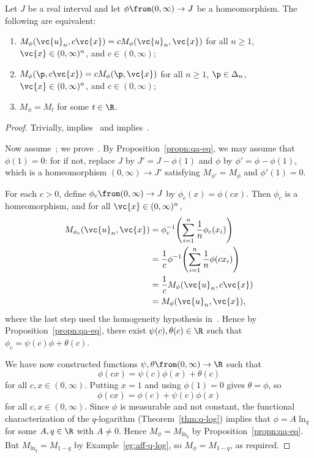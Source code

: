 \begin{thm}
% 
Let $J$ be a real interval and let $\phi \from (0, \infty) \to J$ be a
homeomorphism.  The following are equivalent:
% 
\begin{enumerate}
\item 
{}
$M_\phi(\vc{u}_n, c\vc{x}) = cM_\phi(\vc{u}_n, \vc{x})$ for all $n \geq 1$,
$\vc{x} \in (0, \infty)^n$, and $c \in (0, \infty)$;

\item
{}
$M_\phi(\p, c\vc{x}) = cM_\phi(\p, \vc{x})$ for all $n \geq 1$, $\p \in
\Delta_n$, $\vc{x} \in (0, \infty)^n$, and $c \in (0, \infty)$;

\item
{}
$M_\phi = M_t$ for some $t \in \R$.
\end{enumerate}
\end{thm}

\begin{proof}
Trivially,  implies~ and
 implies~.

Now assume~; we prove~.
By Proposition~\ref{propn:qa-eq}, we may assume that $\phi(1) = 0$: for if
not, replace $J$ by $J' = J - \phi(1)$ and $\phi$ by $\phi' = \phi -
\phi(1)$, which is a homeomorphism $(0, \infty) \to J'$ satisfying
$M_{\phi'} = M_\phi$ and $\phi'(1) = 0$.

For each $c > 0$, define $\phi_c \from (0, \infty) \to J$ by $\phi_c(x) =
\phi(cx)$.  Then $\phi_c$ is a homeomorphism, and for all $\vc{x} \in (0,
\infty)^n$,
% 
\begin{align*}
M_{\phi_c}(\vc{u}_n, \vc{x})    &
=
\phi_c^{-1} \Biggl( 
\sum_{i = 1}^n \frac{1}{n} \phi_c(x_i) 
\Biggr) \\
&
=
\frac{1}{c} \phi^{-1} \Biggl( 
\sum_{i = 1}^n \frac{1}{n} \phi(cx_i)
\Biggr) \\
&
=
\frac{1}{c} M_\phi(\vc{u}_n, c\vc{x})   \\
&
=
M_\phi(\vc{u}_n, \vc{x}),
\end{align*}
% 
where the last step used the homogeneity hypothesis
in~.  Hence by Proposition~\ref{propn:qa-eq},
there exist $\psi(c), \theta(c) \in \R$ such that $\phi_c = \psi(c)\phi +
\theta(c)$.

We have now constructed functions $\psi, \theta \from (0, \infty) \to \R$
such that 
\[
\phi(cx) = \psi(c) \phi(x) + \theta(c)
\]
for all $c, x \in (0, \infty)$.  Putting $x = 1$ and using $\phi(1) = 0$
gives $\theta = \phi$, so
\[
\phi(cx) = \phi(c) + \psi(c) \phi(x)
\]
for all $c, x \in (0, \infty)$.  Since $\phi$ is measurable and not
constant, the functional characterization of the $q$-logarithm
(Theorem~\ref{thm:q-log}) implies that $\phi = A\ln_q$ for some $A, q \in
\R$ with $A \neq 0$.  Hence $M_\phi = M_{\ln_q}$ by
Proposition~\ref{propn:qa-eq}.  But $M_{\ln_q} = M_{1 - q}$ by
Example~\ref{eg:aff-q-log}, so $M_\phi = M_{1 - q}$, as required.
\end{proof}


